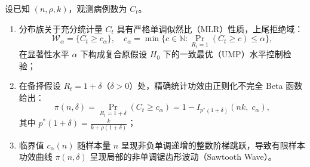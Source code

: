 \begin{proposition}\label{prop:prop5}
设已知 $(n, \rho, k)$，观测病例数为 $C_t$。
\begin{enumerate}[label=(\roman*)]
    \item 分布族关于充分统计量 $C_t$ 具有严格单调似然比（MLR）性质，上尾拒绝域：
    \begin{equation}
    \mathcal{W}_\alpha = \{C_t \ge c_\alpha\}, \quad c_\alpha = \min\big\{ c \in \mathbb{N} : \Pr_{R_t=1}(C_t \ge c) \le \alpha \big\},
    \end{equation}
    在显著性水平 $\alpha$ 下构成复合原假设 $H_0$ 下的一致最优（UMP）水平控制检验；
    \item 在备择假设 $R_t = 1 + \delta$（$\delta > 0$）处，精确统计功效由正则化不完全 Beta 函数给出：
    \begin{equation}
    \pi(n, \delta) = \Pr_{R_t = 1+\delta}(C_t \ge c_\alpha) = 1 - I_{p^*(1+\delta)}(nk, \; c_\alpha), \label{eq:power_exact_formula}
    \end{equation}
    其中 $p^*(1+\delta) = \frac{k}{k + \rho(1+\delta)}$；
    \item 临界值 $c_\alpha(n)$ 随样本量 $n$ 呈现非负单调递增的整数阶梯跳跃，导致有限样本功效曲线 $\pi(n, \delta)$ 呈现局部的非单调锯齿形波动（Sawtooth Wave）。
\end{enumerate}
\end{proposition}

